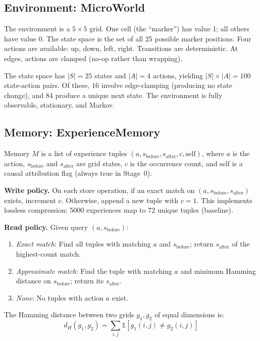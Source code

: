 \documentclass[11pt,a4paper]{article}
\begin{document}
\subsection{Environment: MicroWorld}

The environment is a $5 \times 5$ grid. One cell (the ``marker'') has value 1; all others have value 0. The state space is the set of all 25 possible marker positions. Four actions are available: up, down, left, right. Transitions are deterministic. At edges, actions are clamped (no-op rather than wrapping).

The state space has $|S| = 25$ states and $|A| = 4$ actions, yielding $|S| \times |A| = 100$ state-action pairs. Of these, 16 involve edge-clamping (producing no state change), and 84 produce a unique next state. The environment is fully observable, stationary, and Markov.

\subsection{Memory: ExperienceMemory}

Memory $M$ is a list of experience tuples $(a, s_\text{before}, s_\text{after}, c, \text{self})$, where $a$ is the action, $s_\text{before}$ and $s_\text{after}$ are grid states, $c$ is the occurrence count, and self is a causal attribution flag (always true in Stage~0).

\textbf{Write policy.} On each store operation, if an exact match on $(a, s_\text{before}, s_\text{after})$ exists, increment $c$. Otherwise, append a new tuple with $c = 1$. This implements lossless compression: 5000 experiences map to 72 unique tuples (baseline).

\textbf{Read policy.} Given query $(a, s_\text{before})$:
\begin{enumerate}[nosep]
    \item \textit{Exact match}: Find all tuples with matching $a$ and $s_\text{before}$; return $s_\text{after}$ of the highest-count match.
    \item \textit{Approximate match}: Find the tuple with matching $a$ and minimum Hamming distance on $s_\text{before}$; return its $s_\text{after}$.
    \item \textit{None}: No tuples with action $a$ exist.
\end{enumerate}

The Hamming distance between two grids $g_1, g_2$ of equal dimensions is:
\begin{equation}
    d_H(g_1, g_2) = \sum_{i,j} \mathbb{1}[g_1(i,j) \neq g_2(i,j)]
\end{equation}
\end{document}
